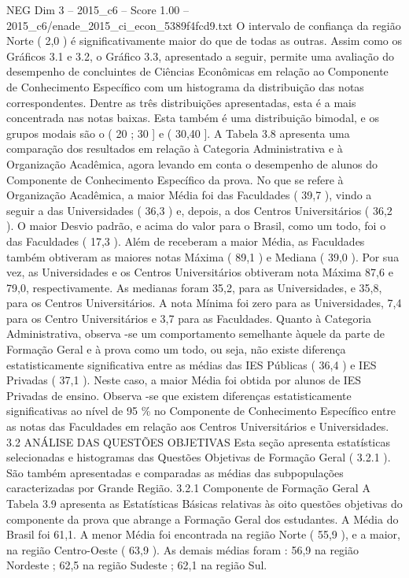 \begin{textsample}{NEG Dim 3 – 2015\_c6 – Score 1.00 – 2015\_c6/enade\_2015\_ci\_econ\_5389f4fcd9.txt}
O intervalo de confiança da região Norte ( 2,0 ) é significativamente maior do que de todas as outras.
Assim como os Gráficos 3.1 e 3.2, o Gráfico 3.3, apresentado a seguir, permite uma avaliação do desempenho de concluintes de Ciências Econômicas em relação ao Componente de Conhecimento Específico com um histograma da distribuição das notas correspondentes.
Dentre as três distribuições apresentadas, esta é a mais concentrada nas notas baixas.
Esta também é uma distribuição bimodal, e os grupos modais são o ( 20 ; 30 ] e ( 30,40 ].
A Tabela 3.8 apresenta uma comparação dos resultados em relação à Categoria Administrativa e à Organização Acadêmica, agora levando em conta o desempenho de alunos do Componente de Conhecimento Específico da prova.
No que se refere à Organização Acadêmica, a maior Média foi das Faculdades ( 39,7 ), vindo a seguir a das Universidades ( 36,3 ) e, depois, a dos Centros Universitários ( 36,2 ).
O maior Desvio padrão, e acima do valor para o Brasil, como um todo, foi o das Faculdades ( 17,3 ).
Além de receberam a maior Média, as Faculdades também obtiveram as maiores notas Máxima ( 89,1 ) e Mediana ( 39,0 ).
Por sua vez, as Universidades e os Centros Universitários obtiveram nota Máxima 87,6 e 79,0, respectivamente.
As medianas foram 35,2, para as Universidades, e 35,8, para os Centros Universitários.
A nota Mínima foi zero para as Universidades, 7,4 para os Centro Universitários e 3,7 para as Faculdades.
Quanto à Categoria Administrativa, observa -se um comportamento semelhante àquele da parte de Formação Geral e à prova como um todo, ou seja, não existe diferença estatisticamente significativa entre as médias das IES Públicas ( 36,4 ) e IES Privadas ( 37,1 ).
Neste caso, a maior Média foi obtida por alunos de IES Privadas de ensino.
Observa -se que existem diferenças estatisticamente significativas ao nível de 95 \% no Componente de Conhecimento Específico entre as notas das Faculdades em relação aos Centros Universitários e Universidades. 3.2 ANÁLISE DAS QUESTÕES OBJETIVAS Esta seção apresenta estatísticas selecionadas e histogramas das Questões Objetivas de Formação Geral ( 3.2.1 ).
São também apresentadas e comparadas as médias das subpopulações caracterizadas por Grande Região. 3.2.1 Componente de Formação Geral A Tabela 3.9 apresenta as Estatísticas Básicas relativas às oito questões objetivas do componente da prova que abrange a Formação Geral dos estudantes.
A Média do Brasil foi 61,1.
A menor Média foi encontrada na região Norte ( 55,9 ), e a maior, na região Centro-Oeste ( 63,9 ).
As demais médias foram : 56,9 na região Nordeste ; 62,5 na região Sudeste ; 62,1 na região Sul.

\end{textsample}
